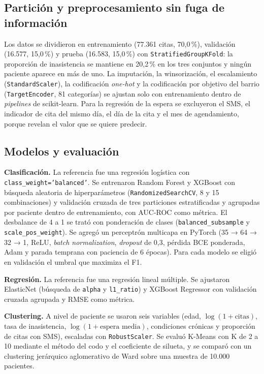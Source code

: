 \documentclass[11pt,letterpaper]{article}
\begin{document}
\subsection{Partición y preprocesamiento sin fuga de información}
Los datos se dividieron en entrenamiento (77.361 citas, 70,0\,\%), validación (16.577, 15,0\,\%) y prueba (16.583, 15,0\,\%) con \texttt{StratifiedGroupKFold}: la proporción de inasistencia se mantiene en 20,2\,\% en los tres conjuntos y ningún paciente aparece en más de uno. La imputación, la winsorización, el escalamiento (\texttt{StandardScaler}), la codificación \emph{one-hot} y la codificación por objetivo del barrio (\texttt{TargetEncoder}, 81 categorías) se ajustan solo con entrenamiento dentro de \emph{pipelines} de scikit-learn. Para la regresión de la espera se excluyeron el SMS, el indicador de cita del mismo día, el día de la cita y el mes de agendamiento, porque revelan el valor que se quiere predecir.

\subsection{Modelos y evaluación}
\textbf{Clasificación.} La referencia fue una regresión logística con \texttt{class\_weight='balanced'}. Se entrenaron Random Forest y XGBoost con búsqueda aleatoria de hiperparámetros (\texttt{RandomizedSearchCV}, 8 y 15 combinaciones) y validación cruzada de tres particiones estratificadas y agrupadas por paciente dentro de entrenamiento, con AUC-ROC como métrica. El desbalance de 4 a 1 se trató con ponderación de clases (\texttt{balanced\_subsample} y \texttt{scale\_pos\_weight}). Se agregó un perceptrón multicapa en PyTorch (35 → 64 → 32 → 1, ReLU, \emph{batch normalization}, \emph{dropout} de 0,3, pérdida BCE ponderada, Adam y parada temprana con paciencia de 6 épocas). Para cada modelo se eligió en validación el umbral que maximiza el F1.

\textbf{Regresión.} La referencia fue una regresión lineal múltiple. Se ajustaron ElasticNet (búsqueda de \texttt{alpha} y \texttt{l1\_ratio}) y XGBoost Regressor con validación cruzada agrupada y RMSE como métrica.

\textbf{Clustering.} A nivel de paciente se usaron seis variables (edad, $\log(1+\text{citas})$, tasa de inasistencia, $\log(1+\text{espera media})$, condiciones crónicas y proporción de citas con SMS), escaladas con \texttt{RobustScaler}. Se evaluó K-Means con K de 2 a 10 mediante el método del codo y el coeficiente de silueta, y se comparó con un clustering jerárquico aglomerativo de Ward sobre una muestra de 10.000 pacientes.
\end{document}
